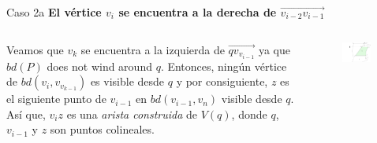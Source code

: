 \documentclass[aspectratio=169,xcolor=dvipsnames, t]{beamer}
\begin{document}
\begin{frame}{Caso 2a}
    \textbf{El vértice $v_{i}$ se encuentra a la derecha de $\overrightarrow{v_{i-2}v_{i-1}}$}\\
    \vspace{0.5cm}
    \begin{columns}
    \begin{column}{0.45\textwidth}
        Veamos que $v_{k}$ se encuentra a la izquierda de $\overrightarrow{qv_{v_{i-1}}}$ ya que $bd(P)$ does not wind around $q$. Entonces, ningún vértice de $bd(v_{i}, v_{v_{k-1}})$ es visible desde $q$ y por consiguiente, $z$ es el siguiente punto de $v_{i-1}$ en $bd(v_{i-1}, v_{n})$ visible desde $q$. Así que, $v_{i}z$ es una \textit{arista construida} de $V(q)$, donde $q$, $v_{i-1}$ y $z$ son puntos colineales.
    \end{column}
    \begin{column}{0.45\textwidth}  %
    \vspace{-1.5cm} %
        \begin{figure}
            \centering
            \includegraphics[width=0.95\textwidth]{imagenes/Caso2.4b.png}
        \end{figure}
    \end{column}
    \end{columns}
\end{frame}

\end{document}
